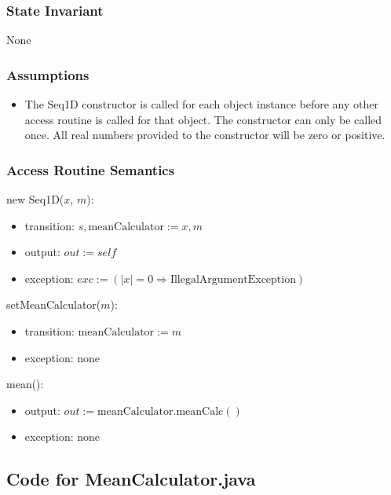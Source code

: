\documentclass[12pt,fleqn]{examtst}
\begin{document}
\subsubsection* {State Invariant}

None

\subsubsection* {Assumptions}

\begin{itemize}
\item The Seq1D constructor is called for each object instance before any other
  access routine is called for that object.  The constructor can only be called
  once.  All real numbers provided to the constructor will be zero or positive.
\end{itemize}

\subsubsection* {Access Routine Semantics}

new Seq1D($x$, $m$):
\begin{itemize}
\item transition: $s, \text{meanCalculator} := x, m$
\item output: $\mathit{out} := \mathit{self}$
\item exception:
  $\mathit{exc} := (|x| = 0 \Rightarrow \mbox{IllegalArgumentException})$
\end{itemize}

\noindent setMeanCalculator($m$):
\begin{itemize}
\item transition: $\mbox{meanCalculator} := m$
\item exception: none
\end{itemize}

\noindent mean():
\begin{itemize}
\item output: $\mathit{out} := \mbox{meanCalculator.meanCalc}()$
\item exception: none
\end{itemize}


\newpage

\subsection*{Code for MeanCalculator.java}
\end{document}
